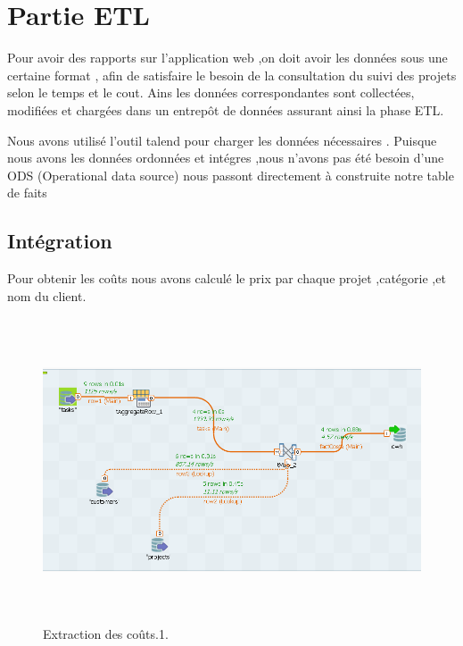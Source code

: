 \section{ Partie ETL }
Pour avoir des rapports sur l'application web ,on doit avoir les donn\'{e}es sous une certaine format ,
afin de satisfaire le besoin de la consultation du suivi des projets selon le temps et le cout.
Ains les donn\'{e}es correspondantes sont collect\'{e}es, modifi\'{e}es et charg\'{e}es dans un entrep\^{o}t de donn\'{e}es
assurant ainsi la phase ETL.

Nous avons utilis\'{e} l'outil talend pour charger les donn\'{e}es n\'{e}cessaires .
Puisque nous avons les donn\'{e}es ordonn\'{e}es et int\'{e}gres ,nous n'avons pas \'{e}t\'{e} besoin d'une ODS (Operational data source)
nous passont directement \`{a} construite notre table de faits



\subsection{Int\'{e}gration}


Pour obtenir les co\^{u}ts nous avons calcul\'{e} le prix par chaque projet
,cat\'{e}gorie ,et nom du client.

\begin{figure}[H]
\center
\includegraphics[width=14cm,height=9cm]{./figures/integ.png}
\caption{Extraction des co\^{u}ts.1.}
\end{figure}



